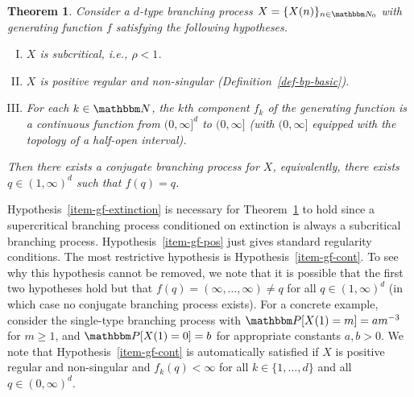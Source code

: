 \documentclass[11pt]{article}
\theoremstyle{plain}
\newtheorem{thm}{Theorem}[section]
\theoremstyle{definition}
\numberwithin{equation}{section}
\newcommand{\BB}{\mathbbm}
\begin{document}
\begin{thm} \label{thm-fixed-gf}
Consider a $d$-type branching process $X = \{X(n)\}_{n\in\BB N_0}$ with generating function $f$ satisfying the following hypotheses. 
\begin{enumerate}[I.]
\item $X$ is subcritical, i.e., $\rho <1$. 
 \label{item-gf-extinction}
\item $X$ is positive regular and non-singular (Definition~\ref{def-bp-basic}).  \label{item-gf-pos} 
\item For each $k\in\BB N$, the $k$th component $f_k$ of the generating function is a continuous function from $(0,\infty]^d$ to $(0,\infty]$ (with $(0,\infty]$ equipped with the topology of a half-open interval). \label{item-gf-cont}
\end{enumerate}
Then there exists a conjugate branching process for $X$, equivalently, there exists $q \in (1,\infty)^d  $ such that $f(q) = q$. 
\end{thm} 

Hypothesis~\ref{item-gf-extinction} is necessary for Theorem~\ref{thm-fixed-gf} to hold since a supercritical branching process conditioned on extinction is always a subcritical branching process. Hypothesis~\ref{item-gf-pos} just gives standard regularity conditions. The most restrictive hypothesis is Hypothesis~\ref{item-gf-cont}. To see why this hypothesis cannot be removed, we note that it is possible that the first two hypotheses hold but that $f(q) = (\infty,\dots,\infty)  \not= q$ for all $q \in (1,\infty)^d  $ (in which case no conjugate branching process exists). For a concrete example, consider the single-type branching process with $\BB P[X(1) = m] = a m^{-3}$ for $m\geq 1$, and $\BB P[X(1) = 0] = b$ for appropriate constants $a,b>0$. We note that Hypothesis~\ref{item-gf-cont} is automatically satisfied if $X$ is positive regular and non-singular and $f_k(q) < \infty$ for all $k\in \{1,\dots,d\}$ and all $q\in (0,\infty)^d$. 
 
\end{document}

